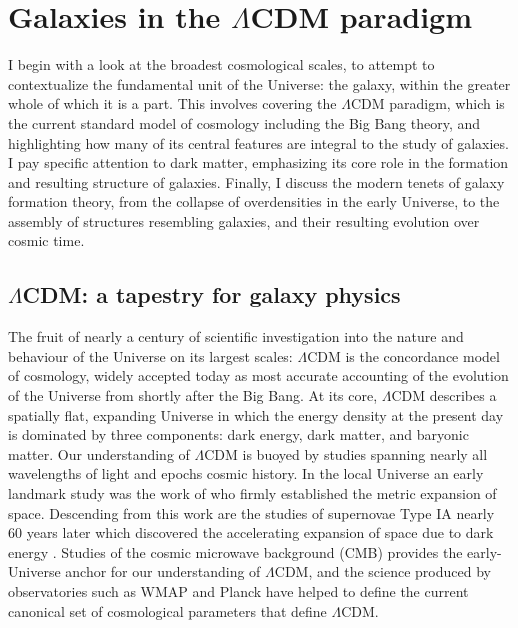 \section{Galaxies in the \texorpdfstring{$\Lambda$CDM}{LambdaCDM} paradigm}

I begin with a look at the broadest cosmological scales, to attempt to contextualize the fundamental unit of the Universe: the galaxy, within the greater whole of which it is a part. This involves covering the $\Lambda$CDM paradigm, which is the current standard model of cosmology including the Big Bang theory, and highlighting how many of its central features are integral to the study of galaxies. I pay specific attention to dark matter, emphasizing its core role in the formation and resulting structure of galaxies. Finally, I discuss the modern tenets of galaxy formation theory, from the collapse of overdensities in the early Universe, to the assembly of structures resembling galaxies, and their resulting evolution over cosmic time.

\subsection{\texorpdfstring{$\Lambda$CDM}{LambdaCDM}: a tapestry for galaxy physics}

The fruit of nearly a century of scientific investigation into the nature and behaviour of the Universe on its largest scales: $\Lambda$CDM is the concordance model of cosmology, widely accepted today as most accurate accounting of the evolution of the Universe from shortly after the Big Bang. At its core, $\Lambda$CDM describes a spatially flat, expanding Universe in which the energy density at the present day is dominated by three components: dark energy, dark matter, and baryonic matter. Our understanding of $\Lambda$CDM is buoyed by studies spanning nearly all wavelengths of light and epochs cosmic history. In the local Universe an early landmark study was the work of \textcite{hubble29} who firmly established the metric expansion of space. Descending from this work are the studies of supernovae Type IA nearly 60 years later which discovered the accelerating expansion of space due to dark energy \parencite{riess98,perlmutter99}. Studies of the cosmic microwave background (CMB) provides the early-Universe anchor for our understanding of $\Lambda$CDM, and the science produced by observatories such as WMAP and Planck have helped to define the current canonical set of cosmological parameters that define $\Lambda$CDM.


